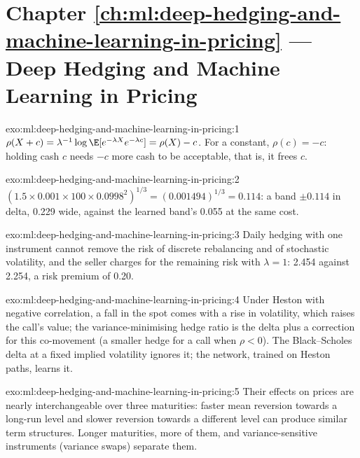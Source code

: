 \section*{Chapter \ref{ch:ml:deep-hedging-and-machine-learning-in-pricing} --- Deep Hedging and Machine Learning in Pricing}

\begin{solution}{exo:ml:deep-hedging-and-machine-learning-in-pricing:1}
$\rho(X + c) = \lambda^{-1}\log\E[e^{-\lambda X}e^{-\lambda c}] = \rho(X) - c$. For a constant, $\rho(c) = -c$: holding cash $c$
needs $-c$ more cash to be acceptable, that is, it frees $c$.
\end{solution}

\begin{solution}{exo:ml:deep-hedging-and-machine-learning-in-pricing:2}
$(1.5\times0.001\times100\times0.0998^2)^{1/3} = (0.001494)^{1/3} = 0.114$: a band $\pm0.114$ in delta, 0.229 wide, against the
learned band's 0.055 at the same cost.
\end{solution}

\begin{solution}{exo:ml:deep-hedging-and-machine-learning-in-pricing:3}
Daily hedging with one instrument cannot remove the risk of discrete rebalancing and of stochastic volatility, and the seller
charges for the remaining risk with $\lambda = 1$: 2.454 against 2.254, a risk premium of 0.20.
\end{solution}

\begin{solution}{exo:ml:deep-hedging-and-machine-learning-in-pricing:4}
Under Heston with negative correlation, a fall in the spot comes with a rise in volatility, which raises the call's value; the
variance-minimising hedge ratio is the delta plus a correction for this co-movement (a smaller hedge for a call when $\rho <
0$). The Black--Scholes delta at a fixed implied volatility ignores it; the network, trained on Heston paths, learns it.
\end{solution}

\begin{solution}{exo:ml:deep-hedging-and-machine-learning-in-pricing:5}
Their effects on prices are nearly interchangeable over three maturities: faster mean reversion towards a long-run level and
slower reversion towards a different level can produce similar term structures. Longer maturities, more of them, and
variance-sensitive instruments (variance swaps) separate them.
\end{solution}


